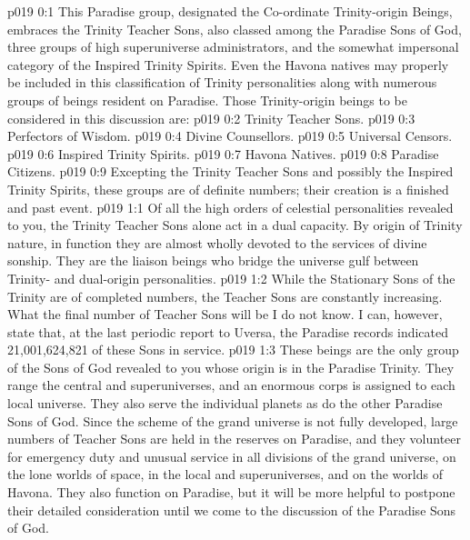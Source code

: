 \author{Divine Counsellor}
\vs p019 0:1 This Paradise group, designated the Co\hyp{}ordinate Trinity\hyp{}origin Beings, embraces the Trinity Teacher Sons, also classed among the Paradise Sons of God, three groups of high superuniverse administrators, and the somewhat impersonal category of the Inspired Trinity Spirits. Even the Havona natives may properly be included in this classification of Trinity personalities along with numerous groups of beings resident on Paradise. Those Trinity\hyp{}origin beings to be considered in this discussion are:
\vs p019 0:2 \bibnobreakspace Trinity Teacher Sons.
\vs p019 0:3 \bibnobreakspace Perfectors of Wisdom.
\vs p019 0:4 \bibnobreakspace Divine Counsellors.
\vs p019 0:5 \bibnobreakspace Universal Censors.
\vs p019 0:6 \bibnobreakspace Inspired Trinity Spirits.
\vs p019 0:7 \bibnobreakspace Havona Natives.
\vs p019 0:8 \bibnobreakspace Paradise Citizens.
\vs p019 0:9 \pc Excepting the Trinity Teacher Sons and possibly the Inspired Trinity Spirits, these groups are of definite numbers; their creation is a finished and past event.
\vs p019 1:1 Of all the high orders of celestial personalities revealed to you, the Trinity Teacher Sons alone act in a dual capacity. By origin of Trinity nature, in function they are almost wholly devoted to the services of divine sonship. They are the liaison beings who bridge the universe gulf between Trinity\hyp{} and dual\hyp{}origin personalities.
\vs p019 1:2 While the Stationary Sons of the Trinity are of completed numbers, the Teacher Sons are constantly increasing. What the final number of Teacher Sons will be I do not know. I can, however, state that, at the last periodic report to Uversa, the Paradise records indicated 21,001,624,821 of these Sons in service.
\vs p019 1:3 These beings are the only group of the Sons of God revealed to you whose origin is in the Paradise Trinity. They range the central and superuniverses, and an enormous corps is assigned to each local universe. They also serve the individual planets as do the other Paradise Sons of God. Since the scheme of the grand universe is not fully developed, large numbers of Teacher Sons are held in the reserves on Paradise, and they volunteer for emergency duty and unusual service in all divisions of the grand universe, on the lone worlds of space, in the local and superuniverses, and on the worlds of Havona. They also function on Paradise, but it will be more helpful to postpone their detailed consideration until we come to the discussion of the Paradise Sons of God.
